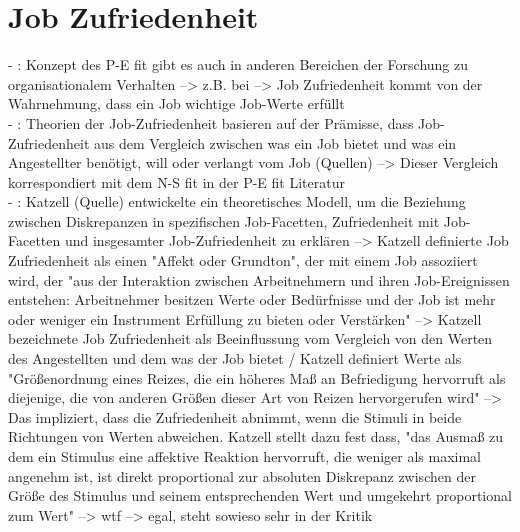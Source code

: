 \section{Job Zufriedenheit}
\label{ch:notizen:jobZufriedenheit}
- \cite[S. 3]{edwards:1990}: Konzept des P-E fit gibt es auch in anderen Bereichen der Forschung zu organisationalem Verhalten --> z.B. bei \textcite{locke:1969} --> Job Zufriedenheit kommt von der Wahrnehmung, dass ein Job wichtige Job-Werte erfüllt \\
- \cite[S. 9]{edwards:2008}: Theorien der Job-Zufriedenheit basieren auf der Prämisse, dass Job-Zufriedenheit aus dem Vergleich zwischen was ein Job bietet und was ein Angestellter benötigt, will oder verlangt vom Job (Quellen) --> Dieser Vergleich korrespondiert mit dem N-S fit in der P-E fit Literatur \\
- \cite[S. 10]{edwards:2008}: Katzell (Quelle) entwickelte ein theoretisches Modell, um die Beziehung zwischen Diskrepanzen in spezifischen Job-Facetten, Zufriedenheit mit Job-Facetten und insgesamter Job-Zufriedenheit zu erklären --> Katzell definierte Job Zufriedenheit als einen "Affekt oder Grundton", der mit einem Job assoziiert wird, der "aus der Interaktion zwischen Arbeitnehmern und ihren Job-Ereignissen entstehen: Arbeitnehmer besitzen Werte oder Bedürfnisse und der Job ist mehr oder weniger ein Instrument Erfüllung zu bieten oder Verstärken" --> Katzell bezeichnete Job Zufriedenheit als Beeinflussung vom Vergleich von den Werten des Angestellten und dem was der Job bietet / Katzell definiert Werte als "Größenordnung eines Reizes, die ein höheres Maß an Befriedigung hervorruft als diejenige, die von anderen Größen dieser Art von Reizen hervorgerufen wird" --> Das impliziert, dass die Zufriedenheit abnimmt, wenn die Stimuli in beide Richtungen von Werten abweichen. Katzell stellt dazu fest dass, "das Ausmaß zu dem ein Stimulus eine affektive Reaktion hervorruft, die weniger als maximal angenehm ist, ist direkt proportional zur absoluten Diskrepanz zwischen der Größe des Stimulus und seinem entsprechenden Wert und umgekehrt proportional zum Wert" --> wtf --> egal, steht sowieso sehr in der Kritik \\
